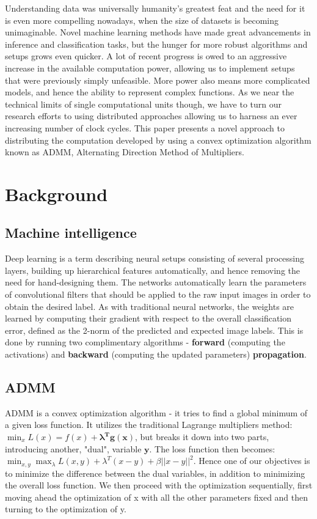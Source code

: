\documentclass[conference]{IEEEtran}
\begin{document}
Understanding data was universally humanity's greatest feat and the need for it is even more compelling nowadays, when the size of datasets is becoming unimaginable. Novel machine learning methods have made great advancements in inference and classification tasks, but the hunger for more robust algorithms and setups grows even quicker. A lot of recent progress is owed to an aggressive increase in the available computation power, allowing us to implement setups that were previously simply unfeasible. More power also means more complicated models, and hence the ability to represent complex functions. As we near the technical limits of single computational units though, we have to turn our research efforts to using distributed approaches allowing us to harness an ever increasing number of clock cycles. This paper presents a novel approach to distributing the computation developed by using a convex optimization algorithm known as ADMM, Alternating Direction Method of Multipliers. 

\section{Background}

\subsection{Machine intelligence}

Deep learning is a term describing neural setups consisting of several processing layers, building up hierarchical features automatically, and hence removing the need for hand-designing them. The networks automatically learn the parameters of convolutional filters that should be applied to the raw input images in order to obtain the desired label. As with traditional neural networks, the weights are learned by computing their gradient with respect to the overall classification error, defined as the 2-norm of the predicted and expected image labels. This is done by running two complimentary algorithms - \textbf{forward} (computing the activations) and \textbf{backward} (computing the updated parameters) \textbf{propagation}.

\subsection{ADMM}

ADMM is a convex optimization algorithm - it tries to find a global minimum of a given loss function. It utilizes the traditional Lagrange multipliers method: $	\min_{x} L(x) = f(x) + \boldsymbol{\lambda^T g(x)}$, but breaks it down into two parts, introducing another, "dual", variable $\boldsymbol{y}$. The loss function then becomes: $\min_{x,y} \max_{\lambda} L(x,y) + \lambda^T (x-y) + \beta ||x-y||^2$. Hence one of our objectives is to minimize the difference between the dual variables, in addition to minimizing the overall loss function. We then proceed with the optimization sequentially, first moving ahead the optimization of x with all the other parameters fixed and then turning to the optimization of y.
\end{document}
